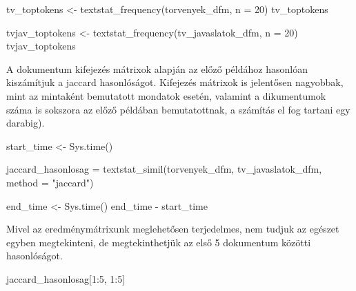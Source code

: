 \documentclass[
]{book}
\newenvironment{Shaded}{\begin{snugshade}}{\end{snugshade}}
\newcommand{\AttributeTok}[1]{\textcolor[rgb]{0.77,0.63,0.00}{#1}}
\newcommand{\DecValTok}[1]{\textcolor[rgb]{0.00,0.00,0.81}{#1}}
\newcommand{\FunctionTok}[1]{\textcolor[rgb]{0.00,0.00,0.00}{#1}}
\newcommand{\NormalTok}[1]{#1}
\newcommand{\OtherTok}[1]{\textcolor[rgb]{0.56,0.35,0.01}{#1}}
\newcommand{\SpecialCharTok}[1]{\textcolor[rgb]{0.00,0.00,0.00}{#1}}
\newcommand{\StringTok}[1]{\textcolor[rgb]{0.31,0.60,0.02}{#1}}
\begin{document}
\begin{Shaded}
\begin{Highlighting}[]
\NormalTok{tv\_toptokens }\OtherTok{\textless{}{-}} \FunctionTok{textstat\_frequency}\NormalTok{(torvenyek\_dfm, }\AttributeTok{n =} \DecValTok{20}\NormalTok{)}
\NormalTok{tv\_toptokens}
\end{Highlighting}
\end{Shaded}

\begin{Shaded}
\begin{Highlighting}[]
\NormalTok{tvjav\_toptokens }\OtherTok{\textless{}{-}} \FunctionTok{textstat\_frequency}\NormalTok{(tv\_javaslatok\_dfm, }\AttributeTok{n =} \DecValTok{20}\NormalTok{)}
\NormalTok{tvjav\_toptokens}
\end{Highlighting}
\end{Shaded}

A dokumentum kifejezés mátrixok alapján az előző példához hasonlóan
kiszámítjuk a jaccard hasonlóságot. Kifejezés mátrixok is jelentősen
nagyobbak, mint az mintaként bemutatott mondatok esetén, valamint a
dikumentumok száma is sokszora az előző példában bemutatottnak, a
számítás el fog tartani egy darabig).

\begin{Shaded}
\begin{Highlighting}[]
\NormalTok{start\_time }\OtherTok{\textless{}{-}} \FunctionTok{Sys.time}\NormalTok{()}

\NormalTok{jaccard\_hasonlosag }\OtherTok{=} \FunctionTok{textstat\_simil}\NormalTok{(torvenyek\_dfm, tv\_javaslatok\_dfm, }\AttributeTok{method =} \StringTok{"jaccard"}\NormalTok{) }

\NormalTok{end\_time }\OtherTok{\textless{}{-}} \FunctionTok{Sys.time}\NormalTok{()}
\NormalTok{end\_time }\SpecialCharTok{{-}}\NormalTok{ start\_time}
\end{Highlighting}
\end{Shaded}

Mivel az eredménymátrixunk meglehetősen terjedelmes, nem tudjuk az
egészet egyben megtekinteni, de megtekinthetjük az első 5 dokumentum
közötti hasonlóságot.

\begin{Shaded}
\begin{Highlighting}[]
\NormalTok{jaccard\_hasonlosag[}\DecValTok{1}\SpecialCharTok{:}\DecValTok{5}\NormalTok{, }\DecValTok{1}\SpecialCharTok{:}\DecValTok{5}\NormalTok{]}
\end{Highlighting}
\end{Shaded}
\end{document}
